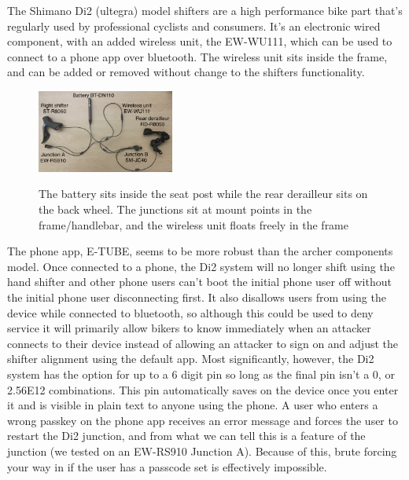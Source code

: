 \documentclass[letterpaper,twocolumn,10pt]{article}
\begin{document}
The Shimano Di2 (ultegra) model shifters are a high performance bike part that's regularly used by professional cyclists and consumers. It's an electronic wired component, with an added wireless unit, the EW-WU111, which can be used to connect to a phone app over bluetooth. The wireless unit sits inside the frame, and can be added or removed without change to the shifters functionality.

\begin{figure}[ht]
\begin{center}
\centering
\includegraphics[width=0.4\textwidth]{images/IMG_5264_Di2.jpg}
\label{fig:Di2Setup}
\end{center}
\caption{The battery sits inside the seat post while the rear derailleur sits on the back wheel. The junctions sit at mount points in the frame/handlebar, and the wireless unit floats freely in the frame}
\end{figure}

The phone app, E-TUBE, seems to be more robust than the archer components model. Once connected to a phone, the Di2 system will no longer shift using the hand shifter and other phone users can't boot the initial phone user off without the initial phone user disconnecting first. It also disallows users from using the device while connected to bluetooth, so although this could be used to deny service it will primarily allow bikers to know immediately when an attacker connects to their device instead of allowing an attacker to sign on and adjust the shifter alignment using the default app. Most significantly, however, the Di2 system has the option for up to a 6 digit pin so long as the final pin isn't a 0, or 2.56E12 combinations. This pin automatically saves on the device once you enter it and is visible in plain text to anyone using the phone. A user who enters a wrong passkey on the phone app receives an error message and forces the user to restart the Di2 junction, and from what we can tell this is a feature of the junction (we tested on an EW-RS910 Junction A). Because of this, brute forcing your way in if the user has a passcode set is effectively impossible.
\end{document}
